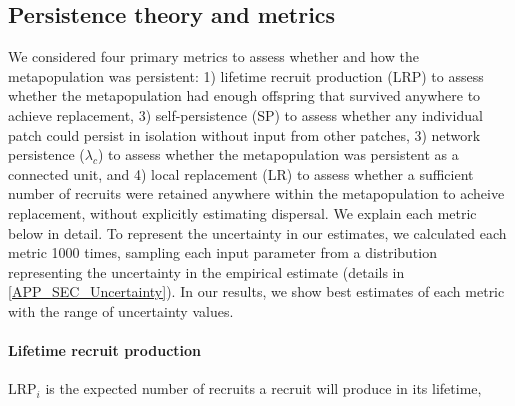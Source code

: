 \documentclass[12pt, oneside]{article}   	%
\begin{document}
\subsection*{Persistence theory and metrics}

We considered four primary metrics to assess whether and how the metapopulation was persistent: 1) lifetime recruit production (LRP) to assess whether the metapopulation had enough offspring that survived anywhere to achieve replacement, 3) self-persistence (SP) to assess whether any individual patch could persist in isolation without input from other patches, 3) network persistence ($\lambda_c$) to assess whether the metapopulation was persistent as a connected unit, and 4) local replacement (LR) to assess whether a sufficient number of recruits were retained anywhere within the metapopulation to acheive replacement, without explicitly estimating dispersal. We explain each metric below in detail. To represent the uncertainty in our estimates, we calculated each metric 1000 times, sampling each input parameter from a distribution representing the uncertainty in the empirical estimate (details in \ref{APP_SEC_Uncertainty}). In our results, we show best estimates of each metric with the range of uncertainty values. %

\paragraph*{Lifetime recruit production}
$\text{LRP}_i$ is the expected number of recruits a recruit will produce in its lifetime,
\end{document}
